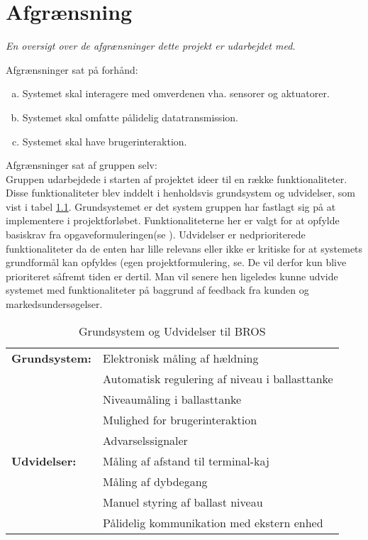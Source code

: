 \chapter{Afgrænsning}
\label{ch:afgraensning}
\textit{En oversigt over de afgrænsninger dette projekt er udarbejdet med.}

Afgrænsninger sat på forhånd:
\begin{enumerate}[a.]
\item Systemet skal interagere med omverdenen vha. sensorer og aktuatorer.
\item Systemet skal omfatte pålidelig datatransmission.
\item Systemet skal have brugerinteraktion.
\end{enumerate}
Afgrænsninger sat af gruppen selv:\\
Gruppen udarbejdede i starten af projektet ideer til en række funktionaliteter. Disse funktionaliteter blev inddelt i henholdsvis grundsystem og udvidelser, som vist i tabel \ref{tabel:Grundogudvid}.
Grundsystemet er det system gruppen har fastlagt sig på at implementere i projektforløbet. Funktionaliteterne her er valgt for at opfylde basiskrav fra opgaveformuleringen(se ).
Udvidelser er nedprioriterede funktionaliteter da de enten har lille relevans eller ikke er kritiske for at systemets grundformål kan opfyldes (egen projektformulering, se. De vil derfor kun blive prioriteret såfremt tiden er dertil. 
Man vil senere hen ligeledes kunne udvide systemet med funktionaliteter på baggrund af feedback fra kunden og markedsundersøgelser.

\begin{table}[H]
\centering
\begin{tabular}{|l|l|}
\hline
\textbf{Grundsystem:} &Elektronisk måling af hældning\\
 &Automatisk regulering af niveau i ballasttanke\\
 &Niveaumåling i ballasttanke\\
 &Mulighed for brugerinteraktion\\
 &Advarselssignaler\\\hline
\textbf{Udvidelser:} &Måling af afstand til terminal-kaj\\
 &Måling af dybdegang\\
 &Manuel styring af ballast niveau\\
 &Pålidelig kommunikation med ekstern enhed\\\hline
\end{tabular}
\caption{Grundsystem og Udvidelser til BROS}
\label{tabel:Grundogudvid}
\end{table}